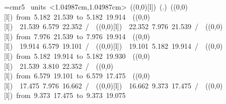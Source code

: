 %
%
\font\thinlinefont=cmr5
%
\begingroup\makeatletter\ifx\SetFigFont\undefined%
\gdef\SetFigFont#1#2#3#4#5{%
  \reset@font\fontsize{#1}{#2pt}%
  \fontfamily{#3}\fontseries{#4}\fontshape{#5}%
  \selectfont}%
\fi\endgroup%
\mbox{\beginpicture
\setcoordinatesystem units <1.04987cm,1.04987cm>
\unitlength=1.04987cm
\linethickness=1pt
\setplotsymbol ({\makebox(0,0)[l]{\tencirc{}}})
\setshadesymbol ({\thinlinefont .})
\setlinear
%
%
\linethickness=1pt
\setplotsymbol ({\makebox(0,0)[l]{\tencirc{}}})
{\color[rgb]{0,0,0}\putrule from  5.182 21.539 to  5.182 19.914
}%
%
%
\linethickness=1pt
\setplotsymbol ({\makebox(0,0)[l]{\tencirc{}}})
{\color[rgb]{0,0,0} 21.539  6.579 22.352 /
}%
%
%
\linethickness=1pt
\setplotsymbol ({\makebox(0,0)[l]{\tencirc{}}})
{\color[rgb]{0,0,0} 22.352  7.976 21.539 /
}%
%
%
\linethickness=1pt
\setplotsymbol ({\makebox(0,0)[l]{\tencirc{}}})
{\color[rgb]{0,0,0}\putrule from  7.976 21.539 to  7.976 19.914
}%
%
%
\linethickness=1pt
\setplotsymbol ({\makebox(0,0)[l]{\tencirc{}}})
{\color[rgb]{0,0,0} 19.914  6.579 19.101 /
}%
%
%
\linethickness=1pt
\setplotsymbol ({\makebox(0,0)[l]{\tencirc{}}})
{\color[rgb]{0,0,0} 19.101  5.182 19.914 /
}%
%
%
\linethickness=1pt
\setplotsymbol ({\makebox(0,0)[l]{\tencirc{}}})
{\color[rgb]{0,0,0}\putrule from  5.182 19.914 to  5.182 19.930
}%
%
%
\linethickness=1pt
\setplotsymbol ({\makebox(0,0)[l]{\tencirc{}}})
{\color[rgb]{0,0,0} 21.539  3.810 22.352 /
}%
%
%
\linethickness=1pt
\setplotsymbol ({\makebox(0,0)[l]{\tencirc{}}})
{\color[rgb]{0,0,0}\putrule from  6.579 19.101 to  6.579 17.475
}%
%
%
\linethickness=1pt
\setplotsymbol ({\makebox(0,0)[l]{\tencirc{}}})
{\color[rgb]{0,0,0} 17.475  7.976 16.662 /
}%
%
%
\linethickness=1pt
\setplotsymbol ({\makebox(0,0)[l]{\tencirc{}}})
{\color[rgb]{0,0,0} 16.662  9.373 17.475 /
}%
%
%
\linethickness=1pt
\setplotsymbol ({\makebox(0,0)[l]{\tencirc{}}})
{\color[rgb]{0,0,0}\putrule from  9.373 17.475 to  9.373 19.075
}%
%
%
\linethickness=1pt
}
